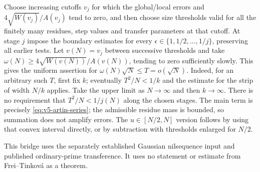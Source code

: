 Choose increasing cutoffs $v_j$ for which the global/local errors and
$4\sqrt{W(v_j)}/A(v_j)$ tend to zero, and then choose size thresholds
valid for all the finitely many residues, step values and transfer
parameters at that cutoff.
At stage $j$ impose the boundary estimates for every
$\epsilon\in\{1,1/2,\ldots,1/j\}$, preserving all earlier tests.
Let $v(N)=v_j$ between successive thresholds and take
$\omega(N)\geq4\sqrt{W(v(N))}/A(v(N))$, tending to zero sufficiently
slowly. This gives the uniform assertion for
$\omega(N)\sqrt N\leq T=o(\sqrt N)$.
Indeed, for an arbitrary such $T$, first fix $k$; eventually
$T^2/N<1/k$ and the estimate for the strip of width $N/k$ applies.
Take the upper limit as $N\to\infty$ and then $k\to\infty$.
There is no requirement that $T^2/N<1/j(N)$ along the chosen stages.
The main term is precisely \eqref{eq:v5-artin-series}; the admissible
residue mass is bounded, so summation does not amplify errors.
The $u\in[N/2,N]$ version follows by using that convex interval directly,
or by subtraction with thresholds enlarged for $N/2$.

This bridge uses the separately established Gaussian nilsequence input
and published ordinary-prime transference. It uses no statement or
estimate from Frei--Tinkov\'a as a theorem.
